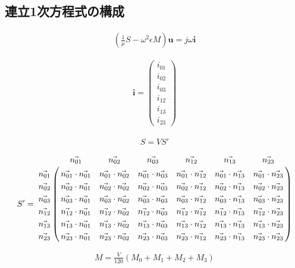 \subsection{連立1次方程式の構成}

\begin{align}
\left(\frac{1}{\mu}S-\omega^2\epsilon M\right)\bm{u}=j\omega\bm{i}
\end{align}

\begin{align}
\bm{i}=
\left(
\begin{array}{c}i_{01}\\i_{02}\\i_{03}\\i_{12}\\i_{13}\\i_{23}
\end{array}
\right)
\end{align}

\begin{align}
S=VS'
\end{align}

\begin{align}
S'=
\bordermatrix{
&\vec{n_{01}}&\vec{n_{02}}&\vec{n_{03}}
&\vec{n_{12}}&\vec{n_{13}}&\vec{n_{23}}\cr
\vec{n_{01}}
&\vec{n_{01}}\cdot\vec{n_{01}}
&\vec{n_{01}}\cdot\vec{n_{02}}
&\vec{n_{01}}\cdot\vec{n_{03}}
&\vec{n_{01}}\cdot\vec{n_{12}}
&\vec{n_{01}}\cdot\vec{n_{13}}
&\vec{n_{01}}\cdot\vec{n_{23}}\cr
\vec{n_{02}}
&\vec{n_{02}}\cdot\vec{n_{01}}
&\vec{n_{02}}\cdot\vec{n_{02}}
&\vec{n_{02}}\cdot\vec{n_{03}}
&\vec{n_{02}}\cdot\vec{n_{12}}
&\vec{n_{02}}\cdot\vec{n_{13}}
&\vec{n_{02}}\cdot\vec{n_{23}}\cr
\vec{n_{03}}
&\vec{n_{03}}\cdot\vec{n_{01}}
&\vec{n_{03}}\cdot\vec{n_{02}}
&\vec{n_{03}}\cdot\vec{n_{03}}
&\vec{n_{03}}\cdot\vec{n_{12}}
&\vec{n_{03}}\cdot\vec{n_{13}}
&\vec{n_{03}}\cdot\vec{n_{23}}\cr
\vec{n_{12}}
&\vec{n_{12}}\cdot\vec{n_{01}}
&\vec{n_{12}}\cdot\vec{n_{02}}
&\vec{n_{12}}\cdot\vec{n_{03}}
&\vec{n_{12}}\cdot\vec{n_{12}}
&\vec{n_{12}}\cdot\vec{n_{13}}
&\vec{n_{12}}\cdot\vec{n_{23}}\cr
\vec{n_{13}}
&\vec{n_{13}}\cdot\vec{n_{01}}
&\vec{n_{13}}\cdot\vec{n_{02}}
&\vec{n_{13}}\cdot\vec{n_{03}}
&\vec{n_{13}}\cdot\vec{n_{12}}
&\vec{n_{13}}\cdot\vec{n_{13}}
&\vec{n_{13}}\cdot\vec{n_{23}}\cr
\vec{n_{23}}
&\vec{n_{23}}\cdot\vec{n_{01}}
&\vec{n_{23}}\cdot\vec{n_{02}}
&\vec{n_{23}}\cdot\vec{n_{03}}
&\vec{n_{23}}\cdot\vec{n_{12}}
&\vec{n_{23}}\cdot\vec{n_{13}}
&\vec{n_{23}}\cdot\vec{n_{23}}
}
\end{align}

\begin{align}
M=\frac{V}{120}
\left(M_0+M_1+M_2+M_3\right)
\end{align}


